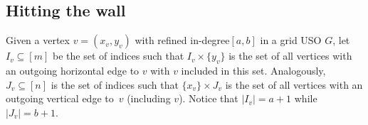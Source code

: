 \documentclass[a4paper,10pt]{article}
\newcommand{\indegree}{refined in-degree\xspace}
\begin{document}
% 
% 


\subsection{Hitting the wall}

Given a vertex $v = (x_v, y_v)$ with \indegree $[a, b]$ in a grid USO $G$, let $I_v\subseteq [m]$ be the set of indices such that  $I_v \times \{y_v\}$ is the set of all vertices with an outgoing horizontal edge to $v$ with $v$ included in this set. Analogously, $J_v\subseteq [n]$ is the set of indices such that $\{x_v\}\times J_v$ is the set of all vertices with an outgoing vertical edge to~$v$ (including $v$). Notice that $|I_v| = a + 1$ while $|J_v| = b + 1$.
\end{document}
